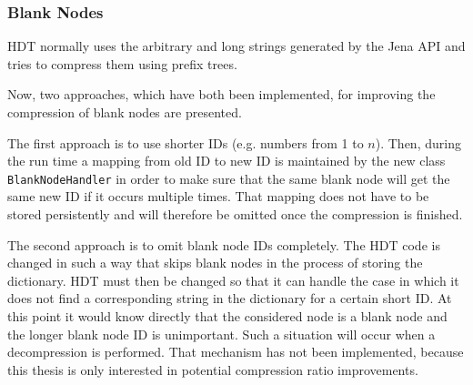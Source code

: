 \subsubsection{Blank Nodes}\label{sec:implementationBlankNodes}

HDT normally uses the arbitrary and long strings generated by the Jena API and tries to compress them using prefix trees.

Now, two approaches, which have both been implemented, for improving the compression of blank nodes are presented.

The first approach is to use shorter IDs (e.g. numbers from 1 to $n$). Then, during the run time a mapping from old ID to new ID is maintained by the new class {\tt BlankNodeHandler} in order to make sure that the same blank node will get the same new ID if it occurs multiple times. That mapping does not have to be stored persistently and will therefore be omitted once the compression is finished.

The second approach is to omit blank node IDs completely. The HDT code is changed in such a way that skips blank nodes in the process of storing the dictionary. HDT must then be changed so that it can handle the case in which it does not find a corresponding string in the dictionary for a certain short ID. At this point it would know directly that the considered node is a blank node and the longer blank node ID is unimportant. Such a situation will occur when a decompression is performed. That mechanism has not been implemented, because this thesis is only interested in potential compression ratio improvements.

















